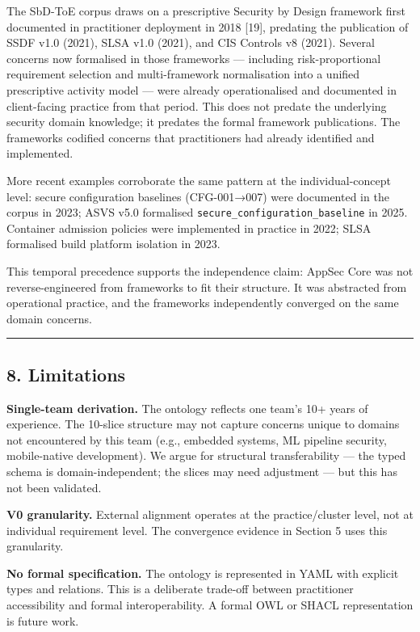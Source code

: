 \documentclass[
]{article}
\begin{document}
The SbD-ToE corpus draws on a prescriptive Security by Design framework
first documented in practitioner deployment in 2018 {[}19{]}, predating
the publication of SSDF v1.0 (2021), SLSA v1.0 (2021), and CIS Controls
v8 (2021). Several concerns now formalised in those frameworks ---
including risk-proportional requirement selection and multi-framework
normalisation into a unified prescriptive activity model --- were
already operationalised and documented in client-facing practice from
that period. This does not predate the underlying security domain
knowledge; it predates the formal framework publications. The frameworks
codified concerns that practitioners had already identified and
implemented.

More recent examples corroborate the same pattern at the
individual-concept level: secure configuration baselines (CFG-001→007)
were documented in the corpus in 2023; ASVS v5.0 formalised
\texttt{secure\_configuration\_baseline} in 2025. Container admission
policies were implemented in practice in 2022; SLSA formalised build
platform isolation in 2023.

This temporal precedence supports the independence claim: AppSec Core
was not reverse-engineered from frameworks to fit their structure. It
was abstracted from operational practice, and the frameworks
independently converged on the same domain concerns.

\begin{center}\rule{0.5\linewidth}{0.5pt}\end{center}

\subsection{8. Limitations}\label{limitations}

\textbf{Single-team derivation.} The ontology reflects one team's 10+
years of experience. The 10-slice structure may not capture concerns
unique to domains not encountered by this team (e.g., embedded systems,
ML pipeline security, mobile-native development). We argue for
structural transferability --- the typed schema is domain-independent;
the slices may need adjustment --- but this has not been validated.

\textbf{V0 granularity.} External alignment operates at the
practice/cluster level, not at individual requirement level. The
convergence evidence in Section 5 uses this granularity.

\textbf{No formal specification.} The ontology is represented in YAML
with explicit types and relations. This is a deliberate trade-off
between practitioner accessibility and formal interoperability. A formal
OWL or SHACL representation is future work.
\end{document}
